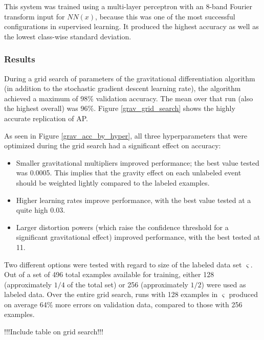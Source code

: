\documentclass[10pt]{article}
\begin{document}
This system was trained using a multi-layer perceptron with an 8-band Fourier transform input for $NN(x)$, because this was one of the most successful configurations in supervised learning. It produced the highest accuracy as well as the lowest class-wise standard deviation.

\subsubsection{Results}

During a grid search of parameters of the gravitational differentiation algorithm (in addition to the stochastic gradient descent learning rate), the algorithm achieved a maximum of 98\% validation accuracy. The mean over that run (also the highest overall) was 96\%. Figure \ref{grav_grid_search} shows the highly accurate replication of AP.

As seen in Figure \ref{grav_acc_by_hyper}, all three hyperparameters that were optimized during the grid search had a significant effect on accuracy:

\begin{itemize}
    \item Smaller gravitational multipliers improved performance; the best value tested was 0.0005. This implies that the gravity effect on each unlabeled event should be weighted lightly compared to the labeled examples.
    \item Higher learning rates improve performance, with the best value tested at a quite high 0.03.
    \item Larger distortion powers (which raise the confidence threshold for a significant gravitational effect) improved performance, with the best tested at 11.
\end{itemize}

Two different options were tested with regard to size of the labeled data set $\varsigma$. Out of a set of 496 total examples available for training, either 128 (approximately $1/4$ of the total set) or 256 (approximately $1/2$) were used as labeled data. Over the entire grid search, runs with 128 examples in $\varsigma$ produced on average 64\% more errors on validation data, compared to those with 256 examples.

!!!Include table on grid search!!!
\end{document}
